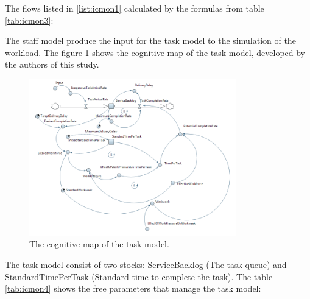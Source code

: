 \documentclass[12pt]{report}
\theoremstyle{definition}
\begin{document}
The flows listed in \ref{list:icmon1} calculated by the formulas from table \ref{tab:icmon3}:
 
\begin{table}[H]
	\centering
	\caption{The formulas for the staff model.}
	\label{tab:icmon3}
\end{table}

The staff model produce the input for the task model to the simulation of the workload. 
The figure  \ref{fig:icmon2} shows the cognitive map of the task model, developed by the authors of this study.

\begin{figure}[ht]
	\centering
	\includegraphics[width=0.8\textwidth]{icmon2}
	\caption{The cognitive map of the task model.}
	\label{fig:icmon2}
\end{figure}  

The task model consist of two stocks: ServiceBacklog (The task queue) and StandardTimePerTask (Standard time to complete the task). 
The table \ref{tab:icmon4} shows the free parameters that manage the task model:
\end{document}
